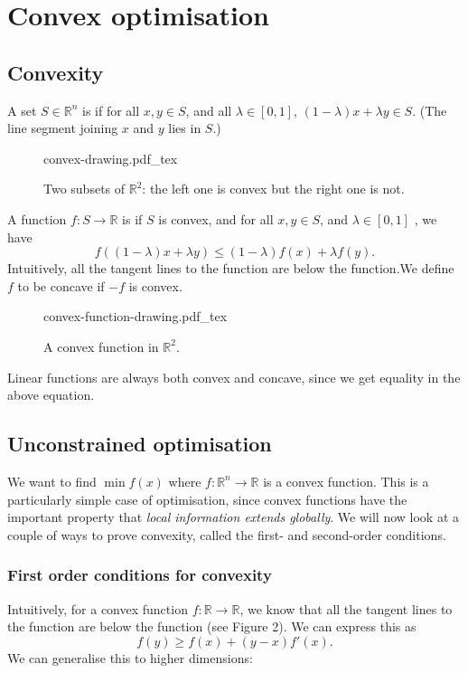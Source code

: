 \documentclass[a4paper]{scrartcl}
\newcommand{\incfig}[2]{%
    \def\svgwidth{#1mm}
    {#2.pdf_tex}
}
\begin{document}
\section{Convex optimisation} 
\subsection{Convexity}
\begin{definition*}
	 A set $S \in \mathbb{R}^{n} $ is  if for all $x,y \in S$, and all $\lambda \in [0,1]$, $(1-\lambda)x+\lambda y \in S$. (The line segment joining $x$ and $y$ lies in $S$.)  
	 \begin{figure}[H]
		\centering
		\incfig{70}{convex-drawing}
		\caption{Two subsets of $\mathbb{R}^{2} $: the left one is convex but the right one is not.}
	\end{figure}
\end{definition*}
\begin{definition*}
	 A function $f:S \rightarrow \mathbb{R}$ is  if $S$ is convex, and for all $x,y \in S$, and $\lambda \in [0,1]$ , we have 
	 \[f((1-\lambda)x+\lambda y)\leq (1-\lambda)f(x)+ \lambda f(y).\] 
	 Intuitively, all the tangent lines to the function are below the function.We define $f$ to be concave if $-f$ is convex.
	 \begin{figure}[H]
		\centering
		\incfig{70}{convex-function-drawing}
		\caption{A convex function in $\mathbb{R}^2$.}
	\end{figure}
\end{definition*}
\begin{remark}
	Linear functions are always both convex and concave, since we get equality in the above equation.
\end{remark}

\subsection{Unconstrained optimisation}
We want to find $\min f(x)$ where $f: \mathbb{R}^{n} \rightarrow \mathbb{R}$ is a convex function. This is a particularly simple case of optimisation, since convex functions have the important property that \emph{local information extends globally}. We will now look at a couple of ways to prove convexity, called the first- and second-order conditions.

\subsubsection{First order conditions for convexity}
Intuitively, for a convex function $f:\mathbb{R} \rightarrow \mathbb{R}$, we know that all the tangent lines to the function are below the function (see Figure 2). We can express this as 
\[f(y) \geq f(x)+(y-x)f'(x).\]
We can generalise this to higher dimensions:
\end{document}
